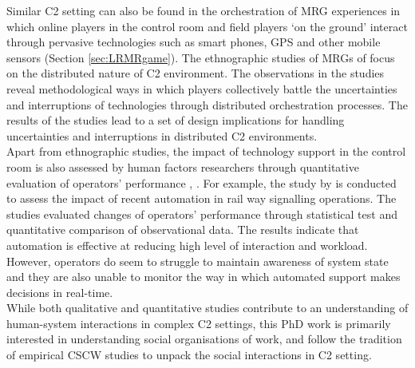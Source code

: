 Similar \ac{C2} setting can also be found in the orchestration of \acf{MRG} experiences in which online players in the control room and field players `on the ground' interact through pervasive technologies such as smart phones, GPS and other mobile sensors (Section \ref{sec:LRMRgame}). The ethnographic studies of \ac{MRG}s of \cite{Benford2006,Crabtree2004,Koleva2001} focus on the distributed nature of \ac{C2} environment. The observations in the studies reveal methodological ways in which players collectively battle the uncertainties and interruptions of technologies through distributed orchestration processes. The results of the studies lead to a set of design implications for handling uncertainties and interruptions in distributed \ac{C2} environments. \\

Apart from ethnographic studies, the impact of technology support in the control room is also assessed by human factors researchers through quantitative evaluation of operators' performance \citep{Grootjen2007}, \citep{Sharples2011}. For example, the study by \cite{Sharples2011} is conducted to assess the impact of recent automation in rail way signalling operations. The studies evaluated changes of operators' performance through statistical test and quantitative comparison of observational data. The results indicate that automation is effective at reducing high level of interaction and workload. However, operators do seem to struggle to maintain awareness of system state and they are also unable to monitor the way in which automated support makes decisions in real-time. \\

While both qualitative and quantitative studies contribute to an understanding of human-system interactions in complex \ac{C2} settings, this PhD work is primarily interested in understanding social organisations of work, and follow the tradition of empirical \ac{CSCW} studies to unpack the social interactions in \ac{C2} setting. \\



